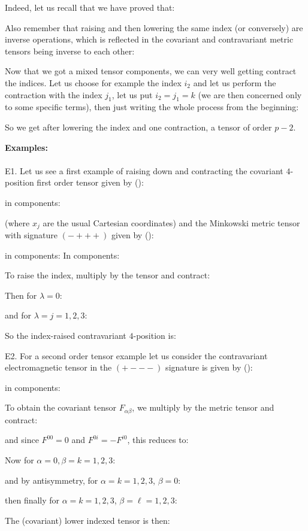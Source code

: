 	Indeed, let us recall that we have proved that:
	
	Also remember that raising and then lowering the same index (or conversely) are inverse operations, which is reflected in the covariant and contravariant metric tensors being inverse to each other:
	
	Now that we got a mixed tensor components, we can very well getting contract the indices. Let us choose for example the index $i_2$ and let us perform the contraction with the index $j_1$, let us put $i_2=j_1=k$ (we are then concerned only to some specific terms), then just writing the whole process from the beginning:
	
	So we get after lowering the index and one contraction, a tensor of order $p-2$.
	\begin{tcolorbox}[colframe=black,colback=white,sharp corners]
	\textbf{{\Large {}}Examples:}\\\\
	E1. Let us see a first example of raising down and contracting the covariant $4$-position first order tensor given by ():
	
	in components:
	
	(where $x_j$ are the usual Cartesian coordinates) and the Minkowski metric tensor with signature $(-+++)$ given by ():
	
	in components:
	In components:
	
	To raise the index, multiply by the tensor and contract:
	
	Then for $\lambda = 0$:
	
	and for $\lambda = j = 1, 2, 3$:
	
	So the index-raised contravariant $4$-position is:
	
	\end{tcolorbox}
	
	\begin{tcolorbox}[colframe=black,colback=white,sharp corners]
	E2. For a second order tensor example let us consider the contravariant electromagnetic tensor in the $(+---)$ signature is given by ():
	
	in components:
	
	To obtain the covariant tensor $F_{\alpha\beta}$, we multiply by the metric tensor and contract:
	
	and since $F^{00} = 0$ and $F^{0i}=-F^{i0}$, this reduces to:
	
	Now for $\alpha = 0, \beta = k = 1, 2, 3$:
	
	and by antisymmetry, for $\alpha = k = 1, 2, 3$, $\beta = 0$:
	
	then finally for $\alpha = k = 1, 2, 3$, $\beta = \ell = 1, 2, 3$:
	
	The (covariant) lower indexed tensor is then:
	
	\end{tcolorbox}
	
